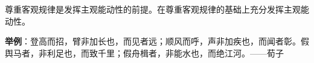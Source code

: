 尊重客观规律是发挥主观能动性的前提。在尊重客观规律的基础上充分发挥主观能动性。

\textbf{{举例}}{{：}登高而招，臂非加长也，而见者远；顺风而呼，声非加疾也，而闻者彰。假舆马者，非利足也，而致千里；假舟楫者，非能水也，而绝江河。------荀子}
